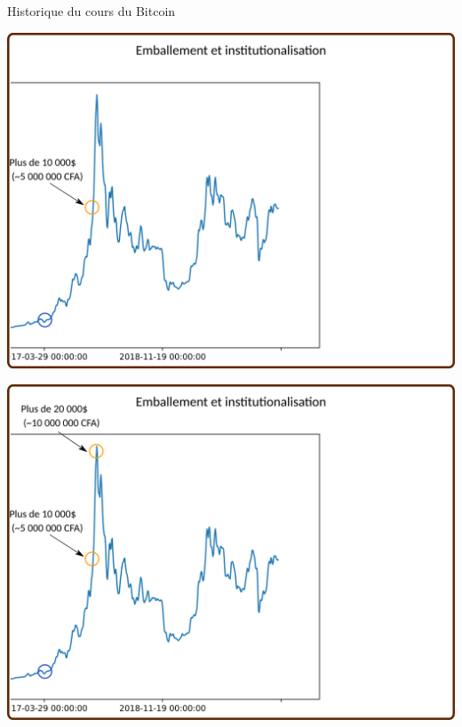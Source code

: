 \documentclass[presentation]{beamer}
\begin{document}
\begin{frame}[label={sec:org6ff9387}]{Historique du cours du Bitcoin}
\begin{block}{}
\begin{center}
\includegraphics[width=.95\textwidth]{./Pictures/Timeline/40emballement.png}
\end{center}
\end{block}

\begin{block}{}
\begin{center}
\includegraphics[width=.95\textwidth]{./Pictures/Timeline/41emballement_20000.png}
\end{center}
\end{block}


\end{frame}
\end{document}
